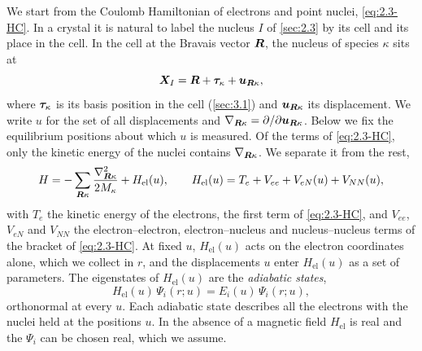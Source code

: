 We start from the Coulomb Hamiltonian of electrons and point nuclei, \cref{eq:2.3-HC}. In a crystal it is natural to label the nucleus $I$ of \cref{sec:2.3} by its cell and its place in the cell. In the cell at the Bravais vector $\bm{R}$, the nucleus of species $\kappa$ sits at
\begin{equation}
  \bm{X}_I = \bm{R} + \bm{\tau}_\kappa + \bm{u}_{\bm{R}\kappa} ,
  \label{eq:5.1-X}
\end{equation}
where $\bm{\tau}_\kappa$ is its basis position in the cell (\cref{sec:3.1}) and $\bm{u}_{\bm{R}\kappa}$ its displacement. We write $u$ for the set of all displacements and $\nabla_{\bm{R}\kappa} = \partial/\partial\bm{u}_{\bm{R}\kappa}$. Below we fix the equilibrium positions about which $u$ is measured. Of the terms of \cref{eq:2.3-HC}, only the kinetic energy of the nuclei contains $\nabla_{\bm{R}\kappa}$. We separate it from the rest,
\begin{equation}
  H = -\sum_{\bm{R}\kappa}\frac{\nabla_{\bm{R}\kappa}^2}{2M_\kappa} + H_{\mathrm{el}}(u), \qquad
  H_{\mathrm{el}}(u) = T_e + V_{ee} + V_{eN}(u) + V_{NN}(u) ,
  \label{eq:5.1-H}
\end{equation}
with $T_e$ the kinetic energy of the electrons, the first term of \cref{eq:2.3-HC}, and $V_{ee}$, $V_{eN}$ and $V_{NN}$ the electron--electron, electron--nucleus and nucleus--nucleus terms of the bracket of \cref{eq:2.3-HC}. At fixed $u$, $H_{\mathrm{el}}(u)$ acts on the electron coordinates alone, which we collect in $r$, and the displacements $u$ enter $H_{\mathrm{el}}(u)$ as a set of parameters. The eigenstates of $H_{\mathrm{el}}(u)$ are the \emph{adiabatic states},
\begin{equation}
  H_{\mathrm{el}}(u)\,\Psi_i(r;u) = E_i(u)\,\Psi_i(r;u) ,
  \label{eq:5.1-adiabatic}
\end{equation}
orthonormal at every $u$. Each adiabatic state describes all the electrons with the nuclei held at the positions $u$. In the absence of a magnetic field $H_{\mathrm{el}}$ is real and the $\Psi_i$ can be chosen real, which we assume.

